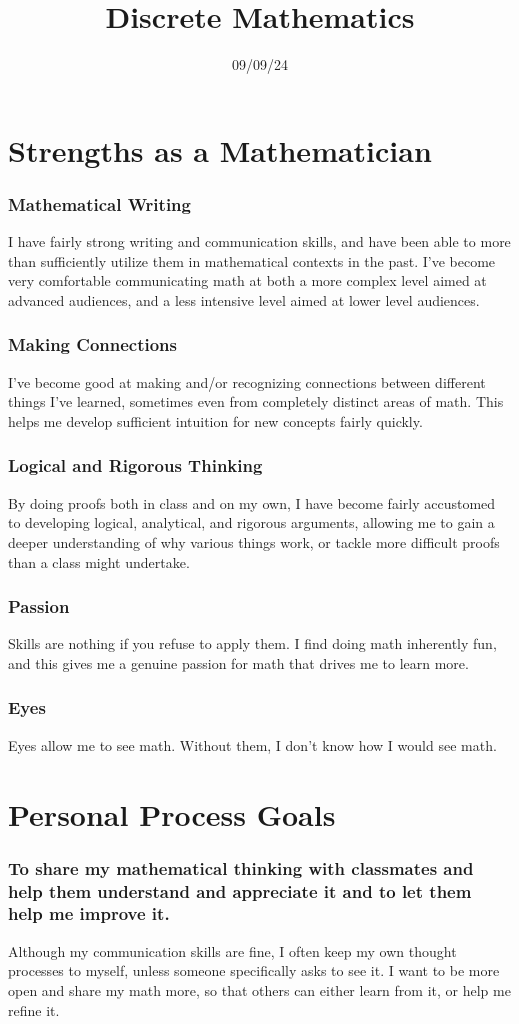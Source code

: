 \documentclass[11pt, letterpaper]{report}
\title{Discrete Mathematics}
\date{09/09/24}
\begin{document}
\makeproblem
\section{Strengths as a Mathematician}
\subsubsection{Mathematical Writing}
I have fairly strong writing and communication skills, and have been able to more than sufficiently utilize them in mathematical contexts in the past. I've become very comfortable communicating math at both a more complex level aimed at advanced audiences, and a less intensive level aimed at lower level audiences.
\subsubsection{Making Connections}
I've become good at making and/or recognizing connections between different things I've learned, sometimes even from completely distinct areas of math. This helps me develop sufficient intuition for new concepts fairly quickly.
\subsubsection{Logical and Rigorous Thinking}
By doing proofs both in class and on my own, I have become fairly accustomed to developing logical, analytical, and rigorous arguments, allowing me to gain a deeper understanding of why various things work, or tackle more difficult proofs than a class might undertake.
\subsubsection{Passion}
Skills are nothing if you refuse to apply them. I find doing math inherently fun, and this gives me a genuine passion for math that drives me to learn more.
\subsubsection{Eyes}
Eyes allow me to see math. Without them, I don't know how I would see math.
\section{Personal Process Goals}
\subsubsection{To share my mathematical thinking with classmates and help
them understand and appreciate it and to let them help me
improve it.}
Although my communication skills are fine, I often keep my own thought processes to myself, unless someone specifically asks to see it. I want to be more open and share my math more, so that others can either learn from it, or help me refine it.
\end{document}

